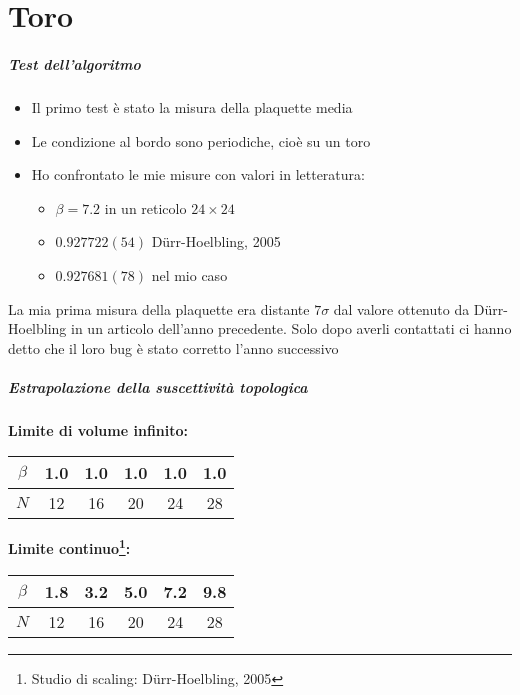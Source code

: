 \part{Toro}
\makepart

\begin{frame}
    \frametitle{Test dell'algoritmo}
    \begin{itemize}
        \item Il primo test è stato la misura della plaquette media
        \item Le condizione al bordo sono periodiche, cioè su un toro
        \item Ho confrontato le mie misure con valori in letteratura:
            \begin{itemize}
                \item[] {\color{fzjred} $\beta = 7.2$ in un reticolo $24\times24$}
                \item $0.927722(54)$ Dürr-Hoelbling, 2005
				\item $0.927681(78)$ nel mio caso
            \end{itemize}
    \end{itemize}
    \pause
    {\color{fzjgreen} La mia prima misura della plaquette era distante $7\sigma$ %
    dal valore ottenuto da Dürr-Hoelbling in un articolo dell'anno precedente. %
    Solo dopo averli contattati ci hanno detto che il loro bug è stato corretto %
    l'anno successivo}
\end{frame}

\begin{frame}
    \frametitle{Estrapolazione della suscettività topologica}
    \begin{center}
        \textbf{Limite di volume infinito:}\\
        \vspace{0.5em}
        \begin{tabular}{cccccc}
            \toprule
            $\beta$ & 1.0 & 1.0 & 1.0 & 1.0 & 1.0 \\\midrule
            $N$     & 12  & 16  & 20  & 24  & 28  \\\bottomrule
        \end{tabular}
    \end{center}
    \begin{center}
        \textbf{Limite continuo\footnote{Studio di scaling: D\"urr-Hoelbling, 2005}:}\\
        \vspace{0.5em}
        \begin{tabular}{cccccc}
            \toprule
            $\beta$ & 1.8 & 3.2 & 5.0 & 7.2 & 9.8 \\\midrule
            $N$     & 12  & 16  & 20  & 24  & 28  \\\bottomrule
        \end{tabular}
    \end{center}
\end{frame}


